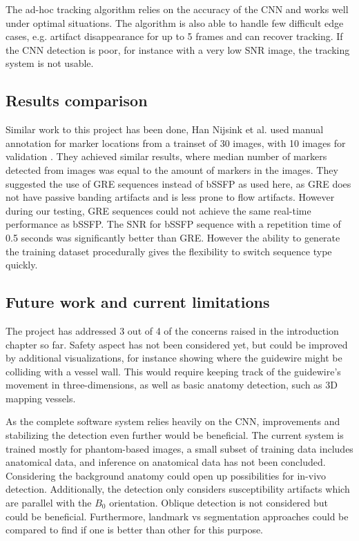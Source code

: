 \documentclass[conference]{IEEEtran}
\begin{document}
The ad-hoc tracking algorithm relies on the accuracy of the CNN and works well under optimal situations. The algorithm is also able to handle few difficult edge cases, e.g. artifact disappearance for up to 5 frames and can recover tracking. If the CNN detection is poor, for instance with a very low SNR image, the tracking system is not usable.

\subsection{Results comparison}
Similar work to this project has been done, 
Han Nijsink et al. used manual annotation for marker locations from a trainset of 30 images, with 10 images for validation \cite{pmid35199259}. They achieved similar results, where median number of markers detected from images was equal to the amount of markers in the images. They suggested the use of GRE sequences instead of bSSFP as used here, as GRE does not have passive banding artifacts and is less prone to flow artifacts. However during our testing, GRE sequences could not achieve the same real-time performance as bSSFP. The SNR for bSSFP sequence with a repetition time of 0.5 seconds was significantly better than GRE. However the ability to generate the training dataset procedurally gives the flexibility to switch sequence type quickly.

\subsection{Future work and current limitations}

The project has addressed 3 out of 4 of the concerns raised in the introduction chapter so far. Safety aspect has not been considered yet, but could be improved by additional visualizations, for instance showing where the guidewire might be colliding with a vessel wall. This would require keeping track of the guidewire's movement in three-dimensions, as well as basic anatomy detection, such as 3D mapping vessels.

As the complete software system relies heavily on the CNN, improvements and stabilizing the detection even further would be beneficial. The current system is trained mostly for phantom-based images, a small subset of training data includes anatomical data, and inference on anatomical data has not been concluded. Considering the background anatomy could open up possibilities for in-vivo detection. Additionally, the detection only considers susceptibility artifacts which 
 are parallel with the \(B_0\) orientation. Oblique detection is not considered but could be beneficial. Furthermore, landmark vs segmentation approaches could be compared to find if one is better than other for this purpose.
\end{document}
